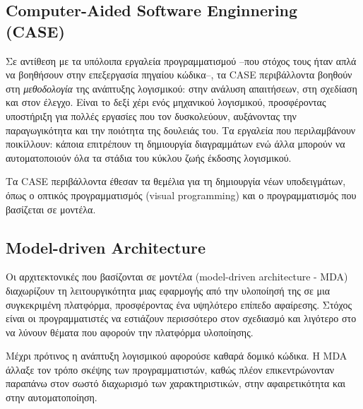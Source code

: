         \subsection{Computer-Aided Software Enginnering (CASE)}
            Σε αντίθεση με τα υπόλοιπα εργαλεία προγραμματισμού --που στόχος τους ήταν απλά να βοηθήσουν στην επεξεργασία πηγαίου κώδικα--, τα CASE περιβάλλοντα βοηθούν στη \textit{μεθοδολογία} της ανάπτυξης λογισμικού: στην ανάλυση απαιτήσεων, στη σχεδίαση και στον έλεγχο. Είναι το δεξί χέρι ενός μηχανικού λογισμικού, προσφέροντας υποστήριξη για πολλές εργασίες που τον δυσκολεύουν, αυξάνοντας την παραγωγικότητα και την ποιότητα της δουλειάς του. \cite{CASEKuhn} Τα εργαλεία που περιλαμβάνουν ποικίλλουν: κάποια επιτρέπουν τη δημιουργία διαγραμμάτων ενώ άλλα μπορούν να αυτοματοποιούν όλα τα στάδια του κύκλου ζωής έκδοσης λογισμικού. \cite{AdoptionCASE}

            Τα CASE περιβάλλοντα έθεσαν τα θεμέλια για τη δημιουργία νέων υποδειγμάτων, όπως ο οπτικός προγραμματισμός (visual programming) και ο προγραμματισμός που βασίζεται σε μοντέλα. \cite{Case1985}






        \subsection{Model-driven Architecture}
        Οι αρχιτεκτονικές που βασίζονται σε μοντέλα (model-driven architecture - MDA) διαχωρίζουν τη λειτουργικότητα μιας εφαρμογής από την υλοποίησή της σε μια συγκεκριμένη πλατφόρμα, προσφέροντας ένα υψηλότερο επίπεδο αφαίρεσης. Στόχος είναι οι προγραμματιστές να εστιάζουν περισσότερο στον σχεδιασμό και λιγότερο στο να λύνουν θέματα που αφορούν την πλατφόρμα υλοποίησης.

        Μέχρι πρότινος η ανάπτυξη λογισμικού αφορούσε καθαρά δομικό κώδικα. Η MDA άλλαξε τον τρόπο σκέψης των προγραμματιστών, καθώς πλέον επικεντρώνονταν παραπάνω στον σωστό διαχωρισμό των χαρακτηριστικών, στην αφαιρετικότητα και στην αυτοματοποίηση. \cite{MDAFAQ,Bucaioni2022}
